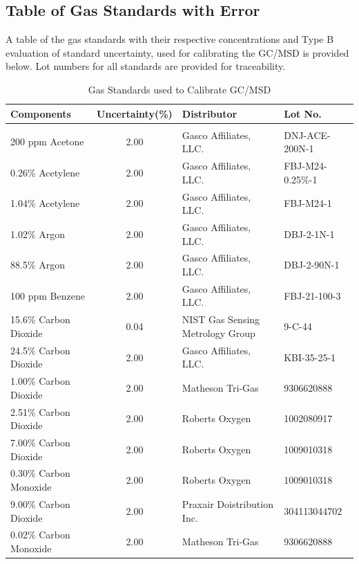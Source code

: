 \documentclass[12pt]{article}
\begin{document}
\pagebreak
\subsection{Table of Gas Standards with Error}
\label{sssec:Table of Gas Standards with Error}
A table of the gas standards with their respective concentrations and Type B evaluation of standard uncertainty, used for calibrating the GC/MSD is provided below. Lot numbers for all standards are provided for traceability.

\begin{table}[h!]

\caption{Gas Standards used to Calibrate GC/MSD}
\label{tab:Gas_Standards_Table}
\centering
	\footnotesize
	\begin{tabular}{lcll}
			\hline
\textbf{Components} &\textbf{Uncertainty(\%)}& \textbf{Distributor}	& \textbf{Lot No.}		\\
\hline
\\[0.001cm]
200 ppm Acetone		&	2.00	&	Gasco Affiliates, LLC. 				&	DNJ-ACE-200N-1		\\
0.26\% Acetylene		&	2.00	&	Gasco Affiliates, LLC.				&	FBJ-M24-0.25\%-1		\\
1.04\% Acetylene		&	2.00	&	Gasco Affiliates, LLC.				&	FBJ-M24-1			\\
1.02\% Argon		&	2.00	&	Gasco Affiliates, LLC.				&	DBJ-2-1N-1			\\
88.5\% Argon		&	2.00	&	Gasco Affiliates, LLC.				&	DBJ-2-90N-1			\\
100 ppm Benzene		&	2.00	&	Gasco Affiliates, LLC.				&	FBJ-21-100-3		\\
15.6\% Carbon Dioxide	&	0.04	&	NIST Gas Sensing Metrology Group		&	9-C-44			\\
24.5\% Carbon Dioxide	&	2.00	&	Gasco Affiliates, LLC. 				&	KBI-35-25-1			\\
1.00\% Carbon Dioxide	&	2.00	&	Matheson Tri-Gas					&	9306620888			\\
2.51\% Carbon Dioxide	&	2.00	&	Roberts Oxygen					&	1002080917			\\
7.00\% Carbon Dioxide	&	2.00	&	Roberts Oxygen					&	1009010318			\\
0.30\% Carbon Monoxide	&	2.00	&	Roberts Oxygen					&	1009010318			\\
9.00\% Carbon Dioxide	&	2.00	&	Praxair Doistribution Inc. 				&	304113044702		\\
0.02\% Carbon Monoxide	&	2.00	&	Matheson Tri-Gas					&	9306620888			\\

\end{tabular}
\end{table}
\end{document}
